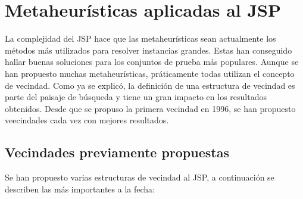 \section{Metaheurísticas aplicadas al JSP}
La complejidad del JSP hace que las metaheurísticas sean actualmente los métodos más utilizados para resolver instancias grandes. Estas han conseguido hallar buenas soluciones para los conjuntos de prueba más populares. Aunque se han propuesto muchas metaheurísticas, práticamente todas utilizan el concepto de vecindad. Como ya se explicó, la definición de una estructura de vecindad es parte del paisaje de búsqueda y tiene un gran impacto en los resultados obtenidos. Desde que se propuso la primera vecindad en 1996, se han propuesto veecindades cada vez con mejores resultados.

\subsection*{Vecindades previamente propuestas}
Se han propuesto varias estructuras de vecindad al JSP, a continuación se describen las más importantes a la fecha:

